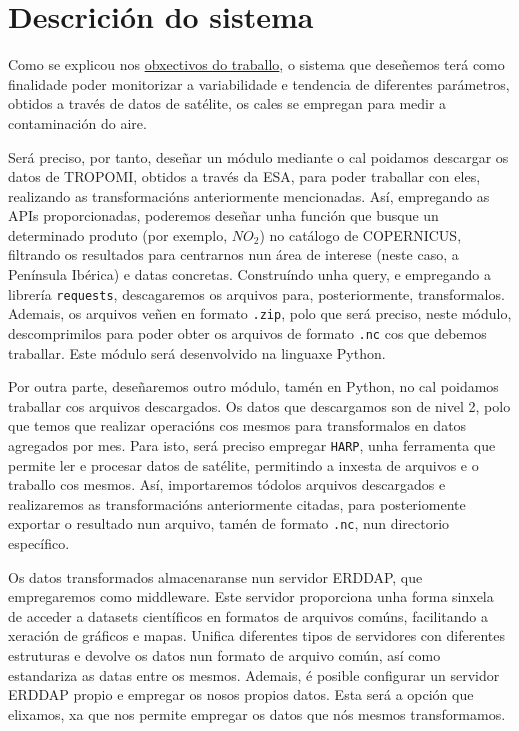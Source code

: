 \section{Descrición do sistema}\label{descricion}
Como se explicou nos \hyperref[sec:obxectivos]{obxectivos do traballo}, o sistema que deseñemos terá como finalidade poder monitorizar a variabilidade e tendencia
de diferentes parámetros, obtidos a través de datos de satélite, os cales se empregan para medir a contaminación do aire.

Será preciso, por tanto, deseñar un módulo  mediante o cal poidamos descargar os datos de TROPOMI, obtidos a través da ESA, para poder traballar con eles, realizando
as transformacións anteriormente mencionadas. Así, empregando as APIs proporcionadas, poderemos deseñar unha función que busque un determinado produto (por exemplo,
$NO_{2}$) no catálogo de COPERNICUS, filtrando os resultados para centrarnos nun área de interese (neste caso, a Península Ibérica) e datas concretas. Construíndo unha
query, e empregando a librería \texttt{requests}, descagaremos os arquivos para, posteriormente, transformalos. Ademais, os arquivos veñen en formato \texttt{.zip}, polo que será
preciso, neste módulo, descomprimilos para poder obter os arquivos de formato \texttt{.nc} cos que debemos traballar. Este módulo será desenvolvido na linguaxe Python.

Por outra parte, deseñaremos outro módulo, tamén en Python, no cal poidamos traballar cos arquivos descargados. Os datos que descargamos son de nivel 2, polo que temos que realizar
operacións cos mesmos para transformalos en datos agregados por mes. Para isto, será preciso empregar \texttt{HARP}, unha ferramenta que permite ler e procesar datos de satélite,
permitindo a inxesta de arquivos e o traballo cos mesmos. Así, importaremos tódolos arquivos descargados e realizaremos as transformacións anteriormente citadas, para posteriomente
exportar o resultado nun arquivo, tamén de formato \texttt{.nc}, nun directorio específico.

Os datos transformados almacenaranse nun servidor ERDDAP, que empregaremos como middleware. Este servidor proporciona unha forma sinxela de acceder a datasets científicos en formatos
de arquivos comúns, facilitando a xeración de gráficos e mapas. Unifica diferentes tipos de servidores con diferentes estruturas e devolve os datos nun formato de arquivo común, así
como estandariza as datas entre os mesmos. Ademais, é posible configurar un servidor ERDDAP propio e empregar os nosos propios datos. Esta será a opción que elixamos, xa que nos permite
empregar os datos que nós mesmos transformamos.

